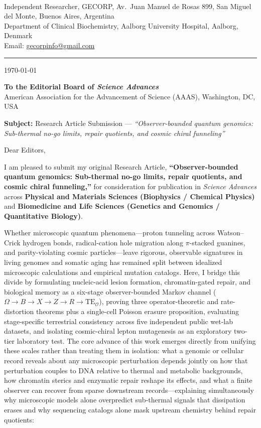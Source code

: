 \documentclass[11pt,letterpaper]{article}
\begin{document}
\thispagestyle{empty}

\\
{\small Independent Researcher, GECORP, Av.\ Juan Manuel de Rosas 899, San Miguel del Monte, Buenos Aires, Argentina\\
Department of Clinical Biochemistry, Aalborg University Hospital, Aalborg, Denmark\\
Email: \href{mailto:gecorpinfo@gmail.com}{gecorpinfo@gmail.com}}

\vspace{0.6em}
\noindent\rule{\textwidth}{0.5pt}
\vspace{0.4em}

\noindent\today

\noindent\textbf{To the Editorial Board of \textit{Science Advances}}\\
American Association for the Advancement of Science (AAAS), Washington, DC, USA

\noindent\textbf{Subject:} Research Article Submission --- \textit{``Observer-bounded quantum genomics: Sub-thermal no-go limits, repair quotients, and cosmic chiral funneling''}

\noindent Dear Editors,

I am pleased to submit my original Research Article, \textbf{``Observer-bounded quantum genomics: Sub-thermal no-go limits, repair quotients, and cosmic chiral funneling,''} for consideration for publication in \textit{Science Advances} across \textbf{Physical and Materials Sciences (Biophysics / Chemical Physics)} and \textbf{Biomedicine and Life Sciences (Genetics and Genomics / Quantitative Biology)}.

Whether microscopic quantum phenomena---proton tunneling across Watson--Crick hydrogen bonds, radical-cation hole migration along $\pi$-stacked guanines, and parity-violating cosmic particles---leave rigorous, observable signatures in living genomes and somatic aging has remained split between idealized microscopic calculations and empirical mutation catalogs. Here, I bridge this divide by formulating nucleic-acid lesion formation, chromatin-gated repair, and biological memory as a six-stage observer-bounded Markov channel ($\Omega \to B \to X \to Z \to R \to \mathrm{TE}_{\mathcal{O}}$), proving three operator-theoretic and rate-distortion theorems plus a single-cell Poisson erasure proposition, evaluating stage-specific terrestrial consistency across five independent public wet-lab datasets, and isolating cosmic-chiral lepton mutagenesis as an exploratory two-tier laboratory test. The core advance of this work emerges directly from unifying these scales rather than treating them in isolation: what a genomic or cellular record reveals about any microscopic perturbation depends jointly on how that perturbation couples to DNA relative to thermal and metabolic backgrounds, how chromatin sterics and enzymatic repair reshape its effects, and what a finite observer can recover from sparse downstream records---explaining simultaneously why microscopic models alone overpredict sub-thermal signals that dissipation erases and why sequencing catalogs alone mask upstream chemistry behind repair quotients:
\end{document}
